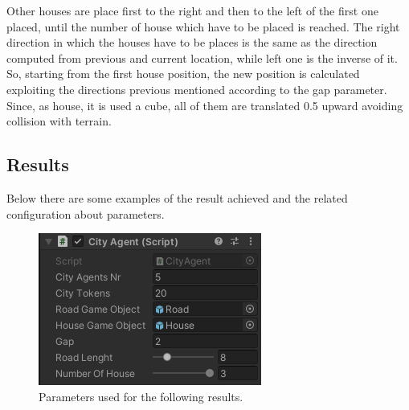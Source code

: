 \documentclass[12pt]{article}
\begin{document}
    Other houses are place first to the right and then to the left of the first one placed, until the number of house which have to be placed is reached. The right direction in which
    the houses have to be places is the same as the direction computed from previous and current location, while left one is the inverse of it. So, starting from the first house position,
    the new position is calculated exploiting the directions previous mentioned according to the gap parameter. Since, as house, it is used a cube, all of them are translated 0.5 upward
    avoiding collision with terrain.

    \subsection{Results}
    Below there are some examples of the result achieved and the related configuration about parameters.

    \begin{figure}[H]
        \centering
        \includegraphics[scale = 0.8]{images/City Agent/1/Parameters}
        \caption{Parameters used for the following results.}
    \end{figure}

    \begin{figure}[H]
        \centering     %
    \end{figure}
\end{document}
